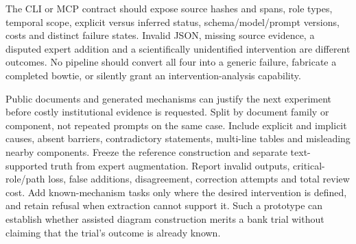 The CLI or MCP contract should expose source hashes and spans, role types, temporal scope, explicit versus inferred status, schema/model/prompt versions, costs and distinct failure states. Invalid JSON, missing source evidence, a disputed expert addition and a scientifically unidentified intervention are different outcomes. No pipeline should convert all four into a generic failure, fabricate a completed bowtie, or silently grant an intervention-analysis capability.

Public documents and generated mechanisms can justify the next experiment before costly institutional evidence is requested. Split by document family or component, not repeated prompts on the same case. Include explicit and implicit causes, absent barriers, contradictory statements, multi-line tables and misleading nearby components. Freeze the reference construction and separate text-supported truth from expert augmentation. Report invalid outputs, critical-role/path loss, false additions, disagreement, correction attempts and total review cost. Add known-mechanism tasks only where the desired intervention is defined, and retain refusal when extraction cannot support it. Such a prototype can establish whether assisted diagram construction merits a bank trial without claiming that the trial's outcome is already known.\citep{exec21_ace,exec21_ace_reference}
